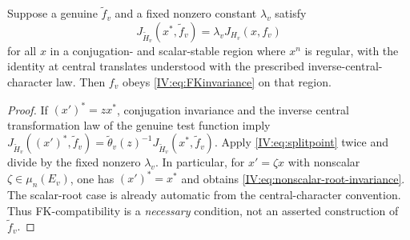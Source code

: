 \begin{lemma}
\label{IV:lem:FKnecessary}
Suppose a genuine $\widetilde f_v$ and a fixed nonzero constant
$\lambda_v$ satisfy
\begin{equation}\label{IV:eq:splitpoint}
 J_{\widetilde H_v}(x^*,\widetilde f_v)
      =\lambda_v J_{H_v}(x,f_v)
\end{equation}
for all $x$ in a conjugation- and scalar-stable region where
$x^n$ is regular, with the identity at central translates understood
with the prescribed inverse-central-character law.  Then $f_v$ obeys
\eqref{IV:eq:FKinvariance} on that region.
\end{lemma}
\begin{proof}
If $({x'})^*=z x^*$, conjugation invariance and the inverse
central transformation law of the genuine test function imply
$J_{\widetilde H_v}(({x'})^*,\widetilde f_v)
=\widetilde\theta_v(z)^{-1}
J_{\widetilde H_v}(x^*,\widetilde f_v)$.
Apply \eqref{IV:eq:splitpoint} twice and divide by the fixed
nonzero $\lambda_v$.  In particular, for $x'=\zeta x$ with nonscalar
$\zeta\in\mu_n(E_v)$, one has $({x'})^*=x^*$ and obtains
\eqref{IV:eq:nonscalar-root-invariance}.  The scalar-root case is
already automatic from the central-character convention.
Thus FK-compatibility is a \emph{necessary} condition,
not an asserted construction of $\widetilde f_v$.
\end{proof}

